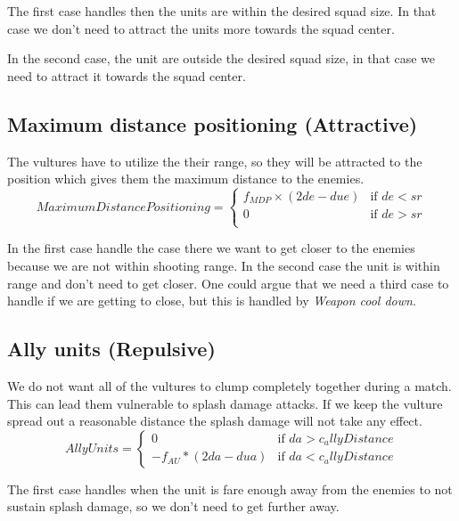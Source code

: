 	    The first case handles then the units are within the desired squad size. In that case we don't need to attract the units more towards the squad center.
	    
	    In the second case, the unit are outside the desired squad size, in that case we need to attract it towards the squad center.
		
	\subsection*{Maximum distance positioning (Attractive)}
		The vultures have to utilize the their range, so they will be attracted to the position which gives them the maximum distance to the enemies.
		\begin{displaymath}
			MaximumDistancePositioning = \begin{cases}
					f_{MDP} \times (2de - due) & \text{if } de < sr\\
					0 & \text{if } de > sr\\
				\end{cases}		
		\end{displaymath}
		
		In the first case handle the case there we want to get closer to the enemies because we are not within shooting range.
		In the second case the unit is within range and don't need to get closer. One could argue that we need a third case to handle if we are getting to close, but this is handled by \textit{Weapon cool down}.
		
	\subsection*{Ally units (Repulsive)}
We do not want all of the vultures to clump completely together during a match. This can lead them vulnerable to splash damage attacks. If we keep the vulture spread out a reasonable distance the splash damage will not take any effect.
		\begin{displaymath}
			AllyUnits = \begin{cases}
					0 & \text{if } da > c_allyDistance\\
					-f_{AU} * (2da - dua) & \text{if } da < c_allyDistance
				\end{cases}		
		\end{displaymath}
	
	The first case handles when the unit is fare enough away from the enemies to not sustain splash damage, so we don't need to get further away.
	
